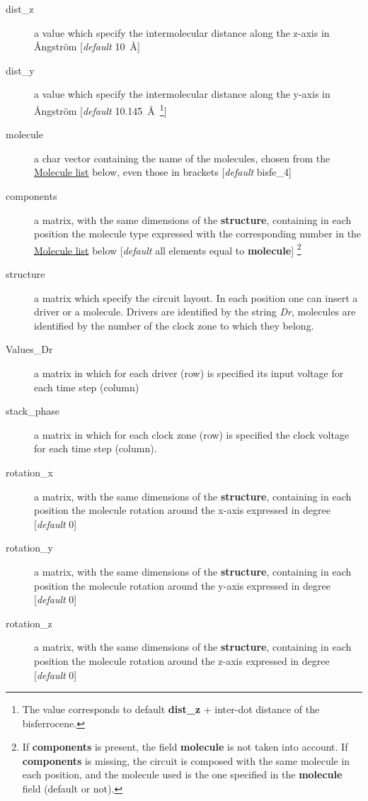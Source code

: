 \documentclass[a4paper,10pt]{article}
\begin{document}
\begin{description}
\item[dist\_z] a value which specify the intermolecular distance along the z-axis in \r{A}ngstr\"{o}m [\textit{default} 10~\AA]
\item[dist\_y] a value which specify the intermolecular distance along the y-axis in \r{A}ngstr\"{o}m [\textit{default} 10.145~\AA~\footnote{The value corresponds to default \textbf{dist\_z} + inter-dot distance of the bisferrocene.}]
\item[molecule] a char vector containing the name of the molecules, chosen from the \underline{Molecule list} below, even those in brackets [\textit{default} bisfe\_4] 
\item[components] a matrix, with the same dimensions of the \textbf{structure}, containing in each position the molecule type expressed with the corresponding number in the \underline{Molecule list} below [\textit{default} all elements equal to \textbf{molecule}] \footnote{If \textbf{components} is present, the field \textbf{molecule} is not taken into account. If \textbf{components} is missing, the circuit is composed with the same molecule in each position, and the molecule used is the one specified in the \textbf{molecule} field (default or not).}
\item[structure \danger] a matrix which specify the circuit layout. In each position one can insert a driver or a molecule. Drivers are identified by the string \textit{Dr}, molecules are identified by the number of the clock zone to which they belong.   
\item[Values\_Dr \danger] a matrix in which for each driver (row) is specified its input voltage for each time step (column)
\item[stack\_phase \danger] a matrix in which for each clock zone (row) is specified the clock voltage for each time step (column).
\item[rotation\_x] a matrix, with the same dimensions of the \textbf{structure}, containing in each position the molecule rotation around the x-axis expressed in degree [\textit{default} 0\textdegree]
\item[rotation\_y] a matrix, with the same dimensions of the \textbf{structure}, containing in each position the molecule rotation around the y-axis expressed in degree [\textit{default} 0\textdegree]
\item[rotation\_z] a matrix, with the same dimensions of the \textbf{structure}, containing in each position the molecule rotation around the z-axis expressed in degree [\textit{default} 0\textdegree]

\end{description}
\end{document}
